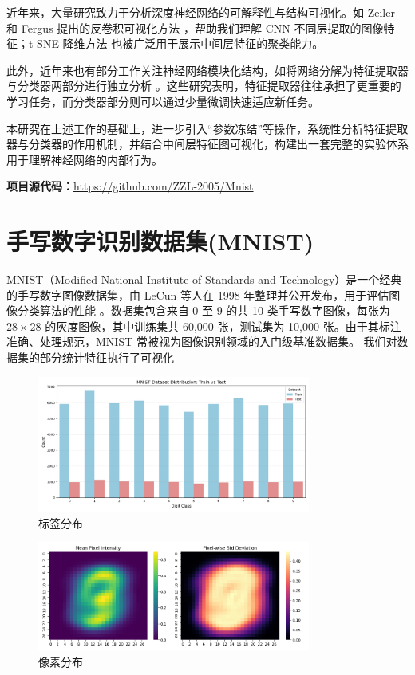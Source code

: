 \documentclass[12pt,a4paper]{article}
\begin{document}
近年来，大量研究致力于分析深度神经网络的可解释性与结构可视化。如 Zeiler 和 Fergus 提出的反卷积可视化方法 \cite{zeiler2014visualizing}，帮助我们理解 CNN 不同层提取的图像特征；t-SNE 降维方法 \cite{maaten2008visualizing} 也被广泛用于展示中间层特征的聚类能力。

此外，近年来也有部分工作关注神经网络模块化结构，如将网络分解为特征提取器与分类器两部分进行独立分析 \cite{yosinski2014transferable}。这些研究表明，特征提取器往往承担了更重要的学习任务，而分类器部分则可以通过少量微调快速适应新任务。

本研究在上述工作的基础上，进一步引入“参数冻结”等操作，系统性分析特征提取器与分类器的作用机制，并结合中间层特征图可视化，构建出一套完整的实验体系用于理解神经网络的内部行为。

\textbf{项目源代码：}\url{https://github.com/ZZL-2005/Mnist}
\section{手写数字识别数据集(MNIST)}
MNIST（Modified National Institute of Standards and Technology）是一个经典的手写数字图像数据集，由 LeCun 等人在 1998 年整理并公开发布，用于评估图像分类算法的性能 \cite{lecun1998gradient}。数据集包含来自 0 至 9 的共 10 类手写数字图像，每张为 $28 \times 28$ 的灰度图像，其中训练集共 60,000 张，测试集为 10,000 张。由于其标注准确、处理规范，MNIST 常被视为图像识别领域的入门级基准数据集。
我们对数据集的部分统计特征执行了可视化
\begin{figure}[H]
    \centering
    \includegraphics[width=0.8\textwidth]{../images/bqfb.png}
    \caption{标签分布}
    \label{fig:td}
\end{figure}
\begin{figure}[h]
    \centering
    \includegraphics[width=0.8\textwidth]{../images/xsfb.png}
    \caption{像素分布}
    \label{fig:xd}
\end{figure}
\end{document}
